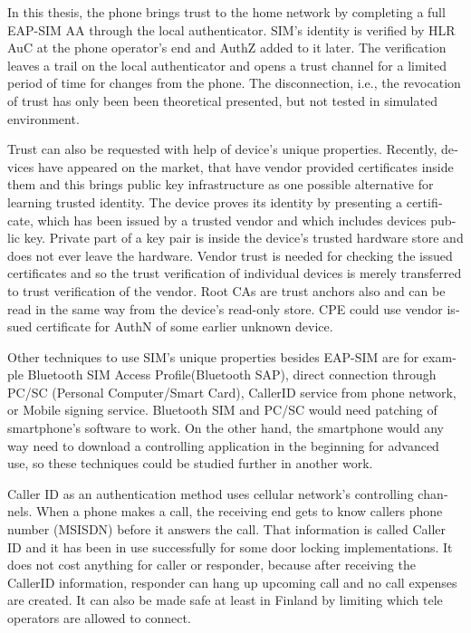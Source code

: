 \documentclass[12pt,a4paper,english]{tutthesis}
\begin{document}
\begin{otherlanguage}{english}
In this thesis,
the phone brings trust to the home network by completing a full EAP-SIM
AA through the local authenticator. SIM's identity is verified by HLR
AuC at the phone operator's end and AuthZ added to it later. The
verification leaves a trail on the local authenticator and opens a
trust channel for a limited period of time for changes from the phone.
The disconnection, i.e., the revocation of trust has only been been theoretical presented,
but not tested in simulated environment.




Trust can also be requested with help of device's unique
properties. Recently, devices have appeared on the market, that have
vendor provided certificates inside them and this brings public key
infrastructure as one possible alternative for learning trusted
identity.  The device proves its identity by presenting a certificate,
which has been issued by a trusted vendor and which includes devices
public key.  Private part of a key pair is inside the device's trusted
hardware store and does not ever leave the hardware. Vendor trust is
needed for checking the issued certificates and so the trust
verification of individual devices is merely transferred to trust
verification of the vendor.  Root CAs are trust anchors also and can
be read in the same way from the device's read-only store.  CPE could
use vendor issued certificate for AuthN of some earlier unknown
device.


Other techniques  to use SIM's unique properties besides EAP-SIM
are for example Bluetooth SIM Access Profile(Bluetooth  SAP), 
direct connection through PC/SC (Personal\- Computer/Smart\- Card),
CallerID service from phone network, or
Mobile signing service.
Bluetooth SIM and PC/SC would need patching of smartphone's software
to work.  On the other hand, the smartphone would any way need to
download  a controlling application
in the beginning for advanced use, so these techniques could be
studied further in another work.

Caller ID as an authentication method uses cellular network's controlling
channels. When a phone makes a call, the receiving end gets 
to know callers phone number (MSISDN) before it answers the call.
That information is called Caller ID and it has been in use
successfully for some door locking implementations. 
It does not cost anything for caller or responder,
because after receiving the CallerID  information, responder can hang
up upcoming call and no call expenses are created.
 It can also be made safe at least in Finland
by limiting which tele operators are allowed to connect.















\end{otherlanguage}
\end{document}
